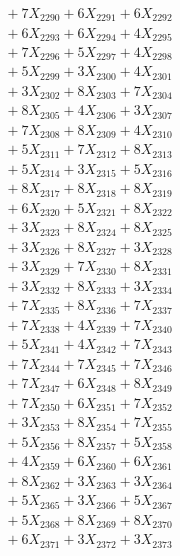 \documentclass[a4paper,10pt]{article}
\begin{document}
{\begin{align}
&\;  + 7 X_{2290} + 6 X_{2291} + 6 X_{2292} \\[0.3ex]
&\;  + 6 X_{2293} + 6 X_{2294} + 4 X_{2295} \\[0.3ex]
&\;  + 7 X_{2296} + 5 X_{2297} + 4 X_{2298} \\[0.3ex]
&\;  + 5 X_{2299} + 3 X_{2300} + 4 X_{2301} \\[0.3ex]
&\;  + 3 X_{2302} + 8 X_{2303} + 7 X_{2304} \\[0.3ex]
&\;  + 8 X_{2305} + 4 X_{2306} + 3 X_{2307} \\[0.3ex]
&\;  + 7 X_{2308} + 8 X_{2309} + 4 X_{2310} \\[0.3ex]
&\;  + 5 X_{2311} + 7 X_{2312} + 8 X_{2313} \\[0.3ex]
&\;  + 5 X_{2314} + 3 X_{2315} + 5 X_{2316} \\[0.3ex]
&\;  + 8 X_{2317} + 8 X_{2318} + 8 X_{2319} \\[0.5ex]\allowbreak
&\;  + 6 X_{2320} + 5 X_{2321} + 8 X_{2322} \\[0.3ex]
&\;  + 3 X_{2323} + 8 X_{2324} + 8 X_{2325} \\[0.3ex]
&\;  + 3 X_{2326} + 8 X_{2327} + 3 X_{2328} \\[0.3ex]
&\;  + 3 X_{2329} + 7 X_{2330} + 8 X_{2331} \\[0.3ex]
&\;  + 3 X_{2332} + 8 X_{2333} + 3 X_{2334} \\[0.3ex]
&\;  + 7 X_{2335} + 8 X_{2336} + 7 X_{2337} \\[0.3ex]
&\;  + 7 X_{2338} + 4 X_{2339} + 7 X_{2340} \\[0.3ex]
&\;  + 5 X_{2341} + 4 X_{2342} + 7 X_{2343} \\[0.3ex]
&\;  + 7 X_{2344} + 7 X_{2345} + 7 X_{2346} \\[0.3ex]
&\;  + 7 X_{2347} + 6 X_{2348} + 8 X_{2349} \\[0.5ex]\allowbreak
&\;  + 7 X_{2350} + 6 X_{2351} + 7 X_{2352} \\[0.3ex]
&\;  + 3 X_{2353} + 8 X_{2354} + 7 X_{2355} \\[0.3ex]
&\;  + 5 X_{2356} + 8 X_{2357} + 5 X_{2358} \\[0.3ex]
&\;  + 4 X_{2359} + 6 X_{2360} + 6 X_{2361} \\[0.3ex]
&\;  + 8 X_{2362} + 3 X_{2363} + 3 X_{2364} \\[0.3ex]
&\;  + 5 X_{2365} + 3 X_{2366} + 5 X_{2367} \\[0.3ex]
&\;  + 5 X_{2368} + 8 X_{2369} + 8 X_{2370} \\[0.3ex]
&\;  + 6 X_{2371} + 3 X_{2372} + 3 X_{2373} \\[0.3ex]

\end{align}}
\end{document}
